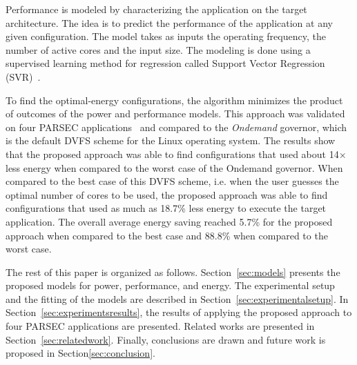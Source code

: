 Performance is modeled by characterizing the application on the target architecture. The idea is to predict the performance of the application at any given configuration. The model takes as inputs the operating frequency, the number of active cores and the input size. The modeling is done using a supervised learning method for regression called Support Vector Regression (SVR)~\cite{Smola2004}.

To find the optimal-energy configurations, the algorithm minimizes the product of outcomes of the power and performance models. This approach was validated on four PARSEC applications~\cite{Bienia2008} and compared to the \emph{Ondemand} governor, which is the default DVFS scheme for the Linux operating system. The results show that the proposed approach was able to find configurations that used about 14$\times$ less energy when compared to the worst case of the Ondemand governor. When compared to the best case of this DVFS scheme, i.e. when the user guesses the optimal number of cores to be used, the proposed approach was able to find configurations that used as much as 18.7\% less energy to execute the target application. The overall average energy saving reached 5.7\% for the proposed approach when compared to the best case and 88.8\% when compared to the worst case.


The rest of this paper is organized as follows. Section~\ref{sec:models} presents the proposed models for power, performance, and energy. The experimental setup and the fitting of the models are described in Section~\ref{sec:experimentalsetup}. In Section~\ref{sec:experimentsresults}, the results of applying the proposed approach to four PARSEC applications are presented. Related works are presented in Section~\ref{sec:relatedwork}. Finally, conclusions are drawn and future work is proposed in Section\ref{sec:conclusion}.




